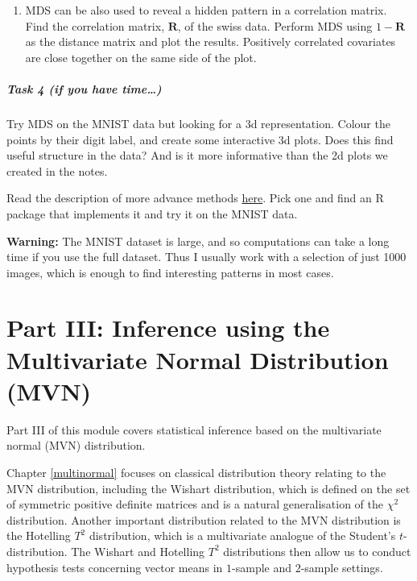 \documentclass[
]{book}
\providecommand{\tightlist}{%
  \setlength{\itemsep}{0pt}\setlength{\parskip}{0pt}}
\theoremstyle{definition}
\theoremstyle{definition}
\theoremstyle{definition}
\theoremstyle{definition}
\theoremstyle{remark}
\begin{document}
\begin{enumerate}
\def\labelenumi{\roman{enumi}.}
\setcounter{enumi}{2}
\tightlist
\item
  MDS can be also used to reveal a hidden pattern in a correlation matrix. Find the correlation matrix, \(\mathbf R\), of the swiss data. Perform MDS using \(1-\mathbf R\) as the distance matrix and plot the results. Positively correlated covariates are close together on the same side of the plot.
\end{enumerate}

\paragraph*{Task 4 (if you have time\ldots)}\label{task-4-if-you-have-time}

Try MDS on the MNIST data but looking for a 3d representation. Colour the points by their digit label, and create some interactive 3d plots. Does this find useful structure in the data? And is it more informative than the 2d plots we created in the notes.

Read the description of more advance methods \href{https://colah.github.io/posts/2014-10-Visualizing-MNIST/}{here}. Pick one and find an R package that implements it and try it on the MNIST data.

\textbf{Warning:} The MNIST dataset is large, and so computations can take a long time if you use the full dataset. Thus I usually work with a selection of just 1000 images, which is enough to find interesting patterns in most cases.

\chapter*{Part III: Inference using the Multivariate Normal Distribution (MVN)}\label{part-iii-inference-using-the-multivariate-normal-distribution-mvn}

Part III of this module covers statistical inference based on the multivariate normal (MVN) distribution.

Chapter \ref{multinormal} focuses on classical distribution theory relating to the MVN distribution, including the Wishart distribution, which is defined on the set of symmetric positive definite matrices and is a natural generalisation of the \(\chi^2\) distribution. Another important distribution related to the MVN distribution is the Hotelling \(T^2\) distribution, which is a multivariate analogue of the Student's \(t\)-distribution.
The Wishart and Hotelling \(T^2\) distributions then allow us to conduct hypothesis tests concerning vector means in \(1\)-sample and \(2\)-sample settings.
\end{document}
